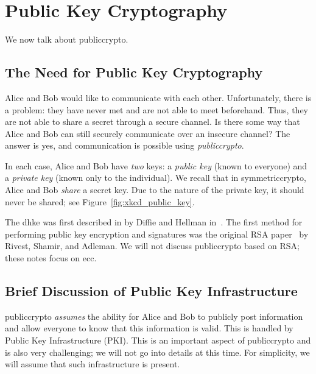 \chapter{Public Key Cryptography}
\label{chap:public}

We now talk about \gls{publiccrypto}.



\section{The Need for Public Key Cryptography}

Alice and Bob would like to communicate with each other.
Unfortunately, there is a problem:
they have never met and are not able to meet beforehand.
Thus, they are not able to share a secret through a \gls{secure channel}.
Is there some way that Alice and Bob can still securely communicate
over an \gls{insecure channel}?
The answer is yes, and communication is possible using
\emph{\gls{publiccrypto}}.

In each case, Alice and Bob have \emph{two} keys:
a \emph{public key} (known to everyone) and
a \emph{private key} (known only to the individual).
We recall that in \gls{symmetriccrypto},
Alice and Bob \emph{share} a secret key.
Due to the nature of the private key, it should never be shared;
see Figure~\ref{fig:xkcd_public_key}.



The \gls{dhke} was first described in
by Diffie and Hellman in~\cite{DHKEpaper}.
The first method for performing \gls{public key encryption}
and \glspl{signature} was the original RSA paper~\cite{RSApaper}
by Rivest, Shamir, and Adleman.
We will not discuss \gls{publiccrypto} based on RSA;
these notes focus on \gls{ecc}.



\section{Brief Discussion of Public Key Infrastructure}

\Gls{publiccrypto} \emph{assumes} the ability for Alice and Bob
to publicly post information and allow everyone to know
that this information is valid.
This is handled by Public Key Infrastructure (PKI).
This is an important aspect of \gls{publiccrypto}
and is also very challenging; we will not go into details at this time.
For simplicity, we will assume that such infrastructure is present.



